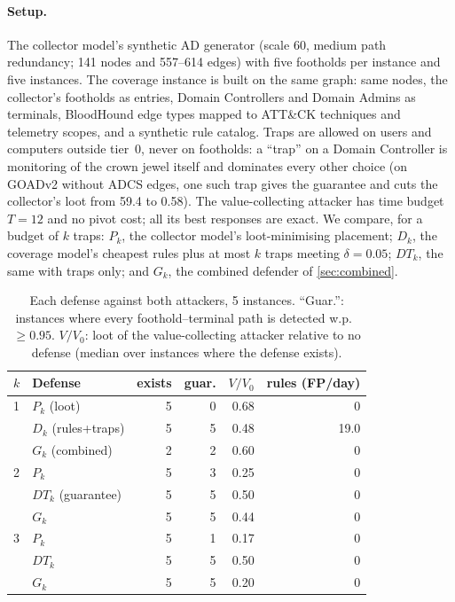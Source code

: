 \documentclass[10pt,twocolumn]{article}
\begin{document}
\paragraph{Setup.} The collector model's synthetic AD generator (scale 60, medium path redundancy; 141
nodes and 557--614 edges) with five footholds per instance and five instances. The coverage
instance is built on the same graph: same nodes, the collector's footholds as entries, Domain
Controllers and Domain Admins as terminals, BloodHound edge types mapped to ATT\&CK
techniques and telemetry scopes, and a synthetic rule catalog. Traps are allowed on users and
computers outside tier~0, never on footholds: a ``trap'' on a Domain Controller is monitoring
of the crown jewel itself and dominates every other choice (on GOADv2 without ADCS edges, one
such trap gives the guarantee and cuts the collector's loot from 59.4 to 0.58). The value-collecting
attacker has time budget $T=12$ and no pivot cost; all its best responses are exact. We
compare, for a budget of $k$ traps: $P_k$, the collector model's loot-minimising placement; $D_k$,
the coverage model's cheapest rules plus at most $k$ traps meeting $\delta=0.05$; $DT_k$, the same with
traps only; and $G_k$, the combined defender of \cref{sec:combined}.

\begin{table}[t]
\centering\footnotesize\setlength{\tabcolsep}{4pt}
\caption{Each defense against both attackers, 5 instances. ``Guar.'': instances where every
foothold--terminal path is detected w.p.\ $\ge 0.95$. $V/V_0$: loot of the value-collecting
attacker relative to no defense (median over instances where the defense exists).}
\label{tab:cross}
\begin{tabular}{@{}llrrrr@{}}
\toprule
$k$ & Defense & exists & guar. & $V/V_0$ & rules (FP/day) \\
\midrule
1 & $P_k$ (loot) & 5 & 0 & 0.68 & 0 \\
  & $D_k$ (rules+traps) & 5 & 5 & 0.48 & 19.0 \\
  & $G_k$ (combined) & 2 & 2 & 0.60 & 0 \\
\midrule
2 & $P_k$ & 5 & 3 & 0.25 & 0 \\
  & $DT_k$ (guarantee) & 5 & 5 & 0.50 & 0 \\
  & $G_k$ & 5 & 5 & 0.44 & 0 \\
\midrule
3 & $P_k$ & 5 & 1 & 0.17 & 0 \\
  & $DT_k$ & 5 & 5 & 0.50 & 0 \\
  & $G_k$ & 5 & 5 & 0.20 & 0 \\
\bottomrule
\end{tabular}
\end{table}
\end{document}

